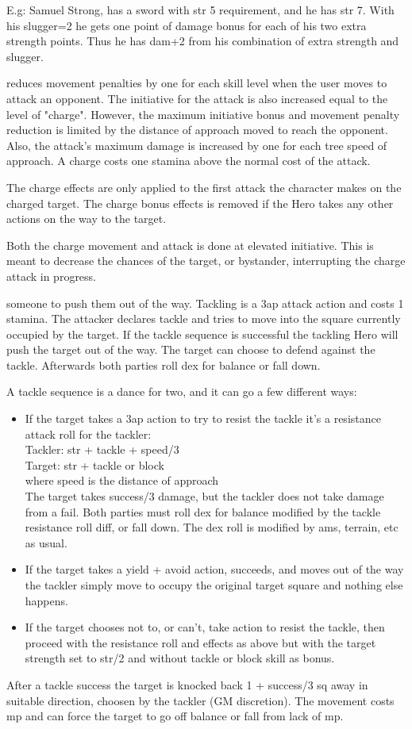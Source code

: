E.g: Samuel Strong, has a sword with str 5 requirement, and he has str 7. With his slugger=2 he gets one point of damage bonus for each of his two extra strength points. Thus he has dam+2 from his combination of extra strength and slugger.


 reduces movement penalties by one for each skill level when the user moves to attack an opponent. The initiative for the attack is also increased equal to the level of "charge". However, the maximum initiative bonus and movement penalty reduction is limited by the distance of approach moved to reach the opponent. Also, the attack's maximum damage is increased by one for each tree speed of approach. A charge costs one stamina above the normal cost of the attack.

The charge effects are only applied to the first attack the character makes on the charged target. The charge bonus effects is removed if the Hero takes any other actions on the way to the target.

Both the charge movement and attack is done at elevated initiative. This is meant to decrease the chances of the target, or bystander, interrupting the charge attack in progress.


 someone to push them out of the way. Tackling is a 3ap attack action and costs 1 stamina. The attacker declares tackle and tries to move into the square currently occupied by the target. If the tackle sequence is successful the tackling Hero will push the target out of the way.
The target can choose to defend against the tackle. Afterwards both parties roll dex for balance or fall down.

A tackle sequence is a dance for two, and it can go a few different ways:
\begin{itemize}
    \item If the target takes a 3ap action to try to resist the tackle it's a resistance attack roll for the tackler:\\
    Tackler: str + tackle + speed/3 \\ 
    Target: str + tackle or block \\
    where speed is the distance of approach \\
    The target takes success/3 damage, but the tackler does not take damage from a fail. Both parties must roll dex for balance modified by the tackle resistance roll diff, or fall down. The dex roll is modified by ams, terrain, etc as usual.
    \item If the target takes a yield + avoid action, succeeds, and moves out of the way the tackler simply move to occupy the original target square and nothing else happens.
    \item If the target chooses not to, or can't, take action to resist the tackle, then proceed with the resistance roll and effects as above but with the target strength set to str/2 and without tackle or block skill as bonus.
\end{itemize}
After a tackle success the target is knocked back 1 + success/3 sq away in suitable direction, choosen by the tackler (GM discretion). The movement costs mp and can force the target to go off balance or fall from lack of mp.

